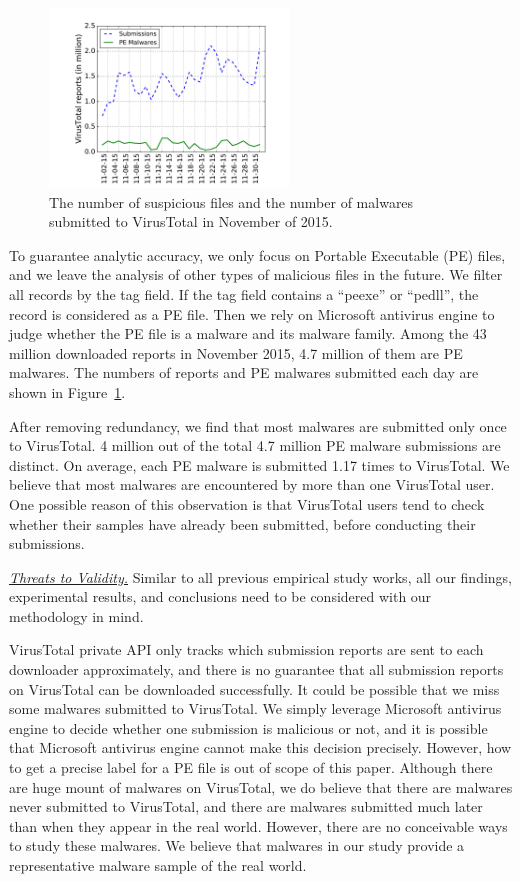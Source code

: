 \begin{figure}[t!]
\begin{center}
\includegraphics[width=2.5in]{figure/nov}
\caption{The number of suspicious files and the number of malwares submitted to VirusTotal in November of 2015. }
\label{fig:subnum}
\end{center}
\end{figure}

To guarantee analytic accuracy, we only focus on Portable Executable (PE) files, 
and we leave the analysis of other types of malicious files in the future. 
We filter all records by the tag field. If the tag field contains a ``peexe'' or ``pedll'', the record is considered as a PE file. 
Then we rely on Microsoft antivirus engine to judge whether the PE file is a malware and its malware family.
Among the 43 million downloaded reports in November 2015, 4.7 million of them are PE malwares. 
The numbers of reports and PE malwares submitted each day are shown in Figure~\ref{fig:subnum}.

After removing redundancy, we find that most malwares are submitted only once to VirusTotal. 4 million out of the total 4.7 million PE malware submissions are distinct. On average, each PE malware is submitted 1.17 times to VirusTotal. We believe that most malwares are encountered by more than one VirusTotal user. One possible reason of this observation is that VirusTotal users 
tend to check whether their samples have already been submitted, 
before conducting their submissions.

\textit{\underline{Threats to Validity.}}
Similar to all previous empirical study works, all our findings, experimental results, 
and conclusions need to be considered with our methodology in mind. 

VirusTotal private API only tracks which submission reports are sent to each downloader approximately, 
and there is no guarantee that all submission reports on VirusTotal can be downloaded successfully. 
It could be possible that we miss some malwares submitted to VirusTotal. 
We simply leverage Microsoft antivirus engine to decide whether one submission is malicious or not, 
and it is possible that Microsoft antivirus engine cannot make this decision precisely. 
However, how to get a precise label for a PE file is out of scope of this paper.  
Although there are huge mount of malwares on VirusTotal, we do believe that there are malwares never submitted to VirusTotal, 
and there are malwares submitted much later than when they appear in the real world.
However, there are no conceivable ways to study these malwares. 
We believe that malwares in our study provide a representative malware sample of the real world. 


